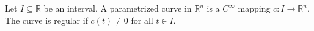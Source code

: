 Let $I \subseteq \mathbb{R}$ be an interval. A parametrized curve in $\mathbb{R}^n$ is a $C^\infty$ mapping $c: I \to \mathbb{R}^n$. The curve is regular if $\dot{c}(t) \neq 0$ for all $t \in I$.